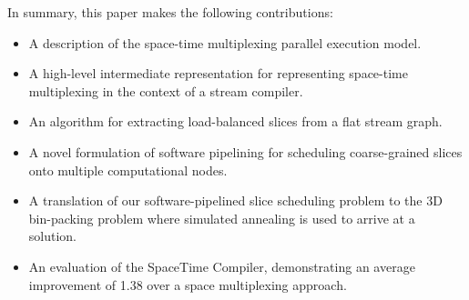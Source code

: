 
In summary, this paper makes the following contributions:

\begin{itemize}
\vspace{-6pt}
\item A description of the space-time multiplexing parallel execution
model.
\vspace{-6pt}
\item A high-level intermediate representation for representing
space-time multiplexing in the context of a stream compiler.  
\vspace{-6pt}
\item An algorithm for extracting load-balanced slices from a flat
stream graph.
\vspace{-6pt}
\item A novel formulation of software pipelining for scheduling
coarse-grained slices onto multiple computational nodes.
\vspace{-6pt}
\item A translation of our software-pipelined slice scheduling problem
to the 3D bin-packing problem where simulated annealing is used to
arrive at a solution.
\vspace{-6pt}
\item An evaluation of the SpaceTime Compiler, 
demonstrating an average improvement of 1.38 over a space multiplexing
approach.
\vspace{-6pt}
\end{itemize}



